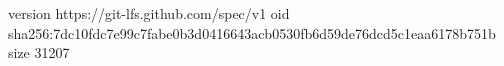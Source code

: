version https://git-lfs.github.com/spec/v1
oid sha256:7dc10fdc7e99c7fabe0b3d0416643acb0530fb6d59de76dcd5c1eaa6178b751b
size 31207
